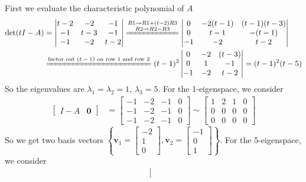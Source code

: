 \documentclass[a4paper,10pt]{article}
\begin{document}
\begin{solution}
First we evaluate the characteristic polynomial of $A$
\begin{align*}
\det(tI-A)&=\left|\begin{matrix}
t-2&-2&-1\\
-1&t-3&-1\\
-1&-2&t-2
\end{matrix}\right|\xequal{\substack{R1\rightarrow R1+(t-2)R3\\R2\rightarrow R2-R3}}\left|\begin{matrix}
0&-2(t-1)&(t-1)(t-3)\\
0&t-1&-(t-1)\\
-1&-2&t-2
\end{matrix}\right|\\
&\xequal{\text{factor out $(t-1)$ on row 1 and row 2}}(t-1)^2\left|\begin{matrix}
0&-2&(t-3)\\
0&1&-1\\
-1&-2&t-2
\end{matrix}\right|=(t-1)^2(t-5)
\end{align*}
So the eigenvalues are $\lambda_1=\lambda_2=1$, $\lambda_3=5$. For the 1-eigenspace, we consider
\begin{align*}
\left[\begin{array}{c|c}
I-A&\mathbf0
\end{array}\right]&=
\left[\begin{array}{ccc|c}
-1&-2&-1&0\\
-1&-2&-1&0\\
-1&-2&-1&0
\end{array}\right]\sim\left[\begin{array}{ccc|c}
1&2&1&0\\
0&0&0&0\\
0&0&0&0
\end{array}\right]
\end{align*}
So we get two basis vectors $\left\{\mathbf v_1=\begin{bmatrix}
-2\\1\\0
\end{bmatrix},\mathbf v_2=\begin{bmatrix}
-1\\0\\1
\end{bmatrix}\right\}$. For the 5-eigenspace, we consider
\begin{align*}
\left[\begin{array}{c|c}

\end{array}
\end{align*}
\end{solution}
\end{document}
